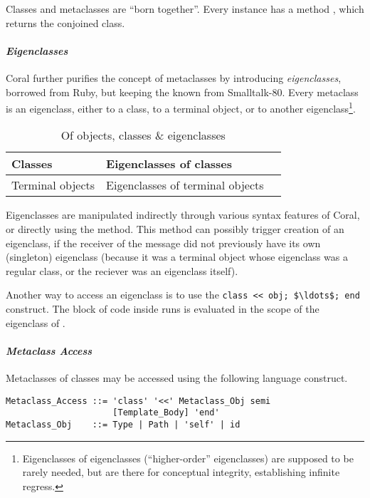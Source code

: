 Classes and metaclasses are ``born together''. Every  instance has a method , which returns the conjoined class. 

\paragraph{\em Eigenclasses}
Coral further purifies the concept of metaclasses by introducing {\em eigenclasses}, borrowed from Ruby, but keeping the  known from Smalltalk-80. Every metaclass is an eigenclass, either to a class, to a terminal object, or to another eigenclass\footnote{Eigenclasses of eigenclasses (``higher-order'' eigenclasses) are supposed to be rarely needed, but are there for conceptual integrity, establishing infinite regress.}. 

\begin{table}[ht]
  \centering
  \caption{Of objects, classes \& eigenclasses}
  \renewcommand{\arraystretch}{1.7}
  \begin{tabular}{ | >{\centering}m{3.5cm} | >{\centering}m{3.5cm} | >{\centering\arraybackslash}m{6cm} | }
  	\hline
    Classes & Eigenclasses of classes & \multirow{2}{*}{Eigenclasses of eigenclasses} \\ \cline{1-2}
    Terminal objects & Eigenclasses of terminal objects & \\
    \hline
  \end{tabular}
\end{table}

Eigenclasses are manipulated indirectly through various syntax features of Coral, or directly using the  method. This method can possibly trigger creation of an eigenclass, if the receiver of the  message did not previously have its own (singleton) eigenclass (because it was a terminal object whose eigenclass was a regular class, or the reciever was an eigenclass itself). 

Another way to access an eigenclass is to use the \lstinline!class << obj; $\ldots$; end! construct. The block of code inside runs is evaluated in the scope of the eigenclass of . 

\paragraph{\em Metaclass Access}
Metaclasses of classes may be accessed using the following language construct. 

\syntax\begin{lstlisting}
Metaclass_Access ::= 'class' '<<' Metaclass_Obj semi 
                     [Template_Body] 'end'
Metaclass_Obj    ::= Type | Path | 'self' | id
\end{lstlisting}

